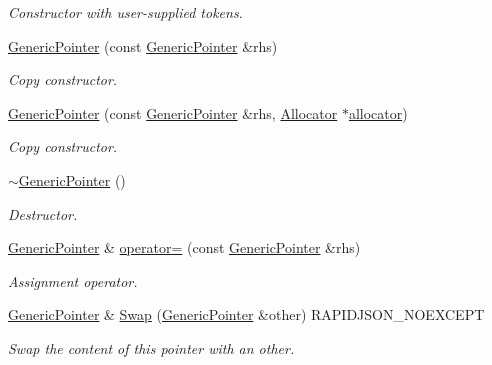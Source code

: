 \begin{DoxyCompactItemize}
\begin{DoxyCompactList}\small\item\em Constructor with user-\/supplied tokens. \end{DoxyCompactList}\item 
\mbox{\hyperlink{classrapidjson_1_1_generic_pointer_ae071847ed3e7389f5b256d26fcc8fd62}{Generic\+Pointer}} (const \mbox{\hyperlink{classrapidjson_1_1_generic_pointer}{Generic\+Pointer}} \&rhs)
\begin{DoxyCompactList}\small\item\em Copy constructor. \end{DoxyCompactList}\item 
\mbox{\hyperlink{classrapidjson_1_1_generic_pointer_afedfcaac36fa589a46667825d3d0b763}{Generic\+Pointer}} (const \mbox{\hyperlink{classrapidjson_1_1_generic_pointer}{Generic\+Pointer}} \&rhs, \mbox{\hyperlink{classrapidjson_1_1_allocator}{Allocator}} $\ast$\mbox{\hyperlink{classrapidjson_1_1_generic_pointer_a3e671447cf032271956fa984aad23ef7}{allocator}})
\begin{DoxyCompactList}\small\item\em Copy constructor. \end{DoxyCompactList}\item 
\mbox{\hyperlink{classrapidjson_1_1_generic_pointer_a0e144b9956a5272c13ceff3b9306e748}{$\sim$\+Generic\+Pointer}} ()
\begin{DoxyCompactList}\small\item\em Destructor. \end{DoxyCompactList}\item 
\mbox{\hyperlink{classrapidjson_1_1_generic_pointer}{Generic\+Pointer}} \& \mbox{\hyperlink{classrapidjson_1_1_generic_pointer_a23194bb6ce6c07c78981344fe80ac3a6}{operator=}} (const \mbox{\hyperlink{classrapidjson_1_1_generic_pointer}{Generic\+Pointer}} \&rhs)
\begin{DoxyCompactList}\small\item\em Assignment operator. \end{DoxyCompactList}\item 
\mbox{\hyperlink{classrapidjson_1_1_generic_pointer}{Generic\+Pointer}} \& \mbox{\hyperlink{classrapidjson_1_1_generic_pointer_a91762c063f390c1463eb772dfd1b822b}{Swap}} (\mbox{\hyperlink{classrapidjson_1_1_generic_pointer}{Generic\+Pointer}} \&other) R\+A\+P\+I\+D\+J\+S\+O\+N\+\_\+\+N\+O\+E\+X\+C\+E\+PT
\begin{DoxyCompactList}\small\item\em Swap the content of this pointer with an other. \end{DoxyCompactList}\item 

\end{DoxyCompactItemize}
